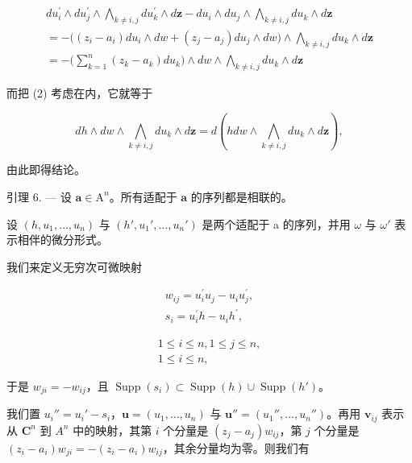 \[
\begin{array}{l} d u _ {i} ^ {\prime} \wedge d u _ {j} ^ {\prime} \wedge \bigwedge_ {k \neq i, j} d u _ {k} ^ {\prime} \wedge d \boldsymbol {z} - d u _ {i} \wedge d u _ {j} \wedge \bigwedge_ {k \neq i, j} d u _ {k} \wedge d \boldsymbol {z} \\ = - \Big ((z _ {i} - a _ {i}) d u _ {i} \wedge d w + (z _ {j} - a _ {j}) d u _ {j} \wedge d w \Big) \wedge \bigwedge_ {k \neq i, j} d u _ {k} \wedge d \boldsymbol {z} \\ = - \Big (\sum_ {k = 1} ^ {n} (z _ {k} - a _ {k})   d u _ {k} \Big) \wedge d w \wedge \bigwedge_ {k \neq i, j} d u _ {k} \wedge d \boldsymbol {z} \end{array}
\]

而把 (2) 考虑在内，它就等于

\[
d h \wedge d w \wedge \bigwedge_ {k \neq i, j} d u _ {k} \wedge d \boldsymbol {z} = d \left(h d w \wedge \bigwedge_ {k \neq i, j} d u _ {k} \wedge d \boldsymbol {z}\right),
\]

由此即得结论。

引理 6. — 设 \(\mathbf{a} \in \mathrm{A}^n\)。所有适配于 \(\mathbf{a}\) 的序列都是相联的。

设 \((h,u_{1},\ldots,u_{n})\) 与 \((h',u_{1}',\ldots,u_{n}')\) 是两个适配于 a 的序列，并用 \(\omega\) 与 \(\omega'\) 表示相伴的微分形式。

我们来定义无穷次可微映射

\[
\begin{array}{c} {w _ {i j} = u _ {i} ^ {\prime} u _ {j} - u _ {i} u _ {j} ^ {\prime},} \\ {s _ {i} = u _ {i} ^ {\prime} h - u _ {i} h ^ {\prime},} \end{array}
\]

\[
\begin{array}{l} 1 \leqslant i \leqslant n, 1 \leqslant j \leqslant n, \\ 1 \leqslant i \leqslant n, \end{array}
\]

于是 \(w_{ji} = -w_{ij}\)，且 \(\operatorname{Supp}(s_i) \subset \operatorname{Supp}(h) \cup \operatorname{Supp}(h')\)。

我们置 \(u_i'' = u_i' - s_i\)，\(\boldsymbol{u} = (u_1, \ldots, u_n)\) 与 \(\boldsymbol{u}'' = (u_1'', \ldots, u_n'')\)。再用 \(\boldsymbol{v}_{ij}\) 表示从 \(\mathbf{C}^n\) 到 \(A^n\) 中的映射，其第 \(i\) 个分量是 \((z_j - a_j) w_{ij}\)，第 \(j\) 个分量是 \((z_i - a_i) w_{ji} = -(z_i - a_i) w_{ij}\)，其余分量均为零。则我们有

